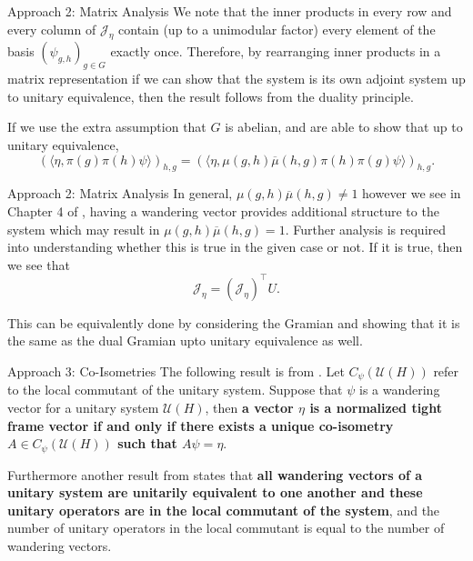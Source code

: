 \documentclass{beamer}
\begin{document}
\begin{frame}{Approach 2: Matrix Analysis}
    We note that the inner products in every row and every column of $\mathcal{J}_{\eta}$ contain (up to a unimodular factor) every element of the basis
 $(\psi_{g,h})_{g\in G}$ exactly once. Therefore, by rearranging inner products in a matrix representation if we can show that the system is its own adjoint system up to unitary equivalence, then the result follows from the duality principle.

If we use the extra assumption that $G$ is abelian, and are able to show that up to unitary equivalence,
\[
\left(\langle\eta,\pi(g)\pi(h)\psi\rangle\right)_{h,g} = 
\left(\langle\eta,\mu(g,h)\overline{\mu}(h,g)\pi(h)\pi(g)\psi\rangle\right)_{h, g}.
\]

\end{frame}

\begin{frame}{Approach 2: Matrix Analysis}
    In general, $\mu(g,h)\overline{\mu}(h,g) \neq 1$ however we see in Chapter 4 of \textbf{\cite{HL2000}}, having a wandering vector provides additional structure to the system which may result in $\mu(g,h)\overline{\mu}(h,g) = 1$. Further analysis is required into understanding whether this is true in the given case or not. If it is true, then we see that 
    \[ \mathcal{J}_{\eta} = (\mathcal{J}_{\eta})^\top U.\]

    This can be equivalently done by considering the Gramian and showing that it is the same as the dual Gramian upto unitary equivalence as well.
\end{frame}

\begin{frame}{Approach 3: Co-Isometries}
    The following result is from \textbf{\cite{HL2000}}. Let $C_{\psi}(\mathcal{U}(H))$ refer to the local commutant of the unitary system. Suppose that $\psi$ is a wandering vector for a unitary system $\mathcal{U}(H)$, then \textbf{a vector $\eta$ is a normalized tight frame vector if and only if there exists a unique co-isometry $A \in C_{\psi}(\mathcal{U}(H))$ such that $A\psi = \eta$}. 

    Furthermore another result from \textbf{\cite{dai1998wandering}} states that \textbf{all wandering vectors of a unitary system are unitarily equivalent to one another and these unitary operators are in the local commutant of the system}, and the number of unitary operators in the local commutant is equal to the number of wandering vectors.
\end{frame}
\end{document}
